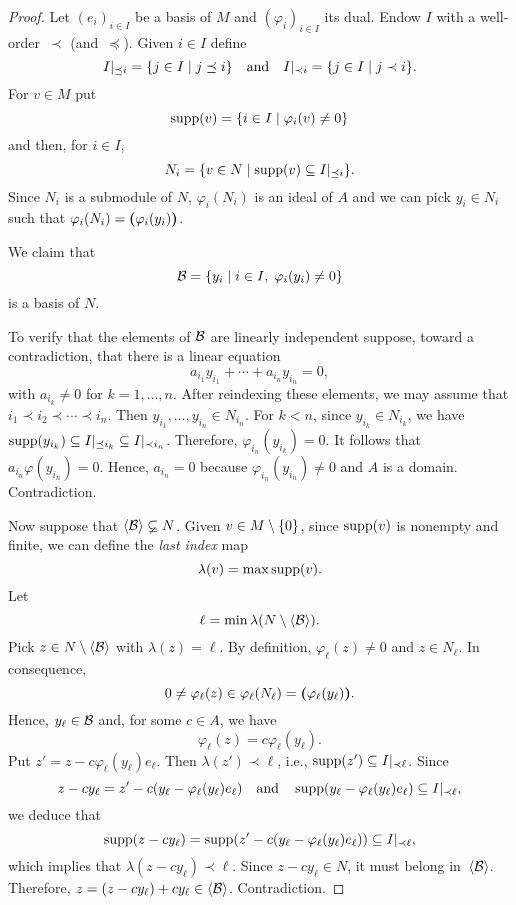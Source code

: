     \begin{proof}
        Let $(e_i)_{i\in I}$ be a basis of $M$ and $(\varphi_i)_{i\in I}$ its dual. Endow $I$ with a well-order~${\prec}$ (and~${\preceq}$). Given $i\in I$ define
        $$
            I|_{\preceq i}=\{j\in I\mid j\preceq i\}
            \quad\text{and}\quad
            I|_{\prec i}=\{j\in I\mid j\prec i\}.
        $$
        For $v\in M$ put
        $$
            \operatorname{supp}(v) = \{i\in I\mid \varphi_i(v)\ne0\}
        $$
        and then, for $i\in I$,
        $$
            N_i = \{v\in N\mid\operatorname{supp}(v)\subseteq I|_{\preceq i}\}.
        $$
        Since $N_i$ is a submodule of $N$, $\varphi_i(N_i)$ is an ideal of $A$ and we can pick $y_i\in N_i$ such that $\varphi_i(N_i)=\textrm{\boldmath$($}\varphi_i(y_i)\textrm{\boldmath$)$}$.
        
        We claim that
        $$
            \mathcal B = \{y_i\mid i\in I,\;\varphi_i(y_i)\ne0\}
        $$
        is a basis of $N$.

        To verify that the elements of $\mathcal B$ are linearly independent suppose, toward a contradiction, that there is a linear equation
        $$
            a_{i_1}y_{i_1}+\cdots+a_{i_n}y_{i_n}=0,
        $$
        with $a_{i_k}\ne0$ for $k=1,\dots,n$. After reindexing these elements, we may assume that $i_1\prec i_2\prec\cdots\prec i_n$. Then $y_{i_1},\dots,y_{i_n}\in N_{i_n}$. For $k<n$, since $y_{i_k}\in N_{i_k}$, we have $\operatorname{supp}(y_{i_k})\subseteq I|_{\preceq i_k}\subseteq I|_{\prec i_n}$. Therefore, $\varphi_{i_n}(y_{i_k})=0$. It follows that $a_{i_n}\varphi(y_{i_n})=0$. Hence, $a_{i_n}=0$ because $\varphi_{i_n}(y_{i_n})\ne0$ and $A$ is a domain. Contradiction.

        Now suppose that $\langle\mathcal B\rangle\varsubsetneq N$. Given $v\in M\setminus\{0\}$, since $\operatorname{supp}(v)$ is nonempty and finite, we can define the \textsl{last index} map
        $$
            \lambda(v)=\max\operatorname{supp}(v).
        $$
        Let
        $$
            \ell = \min\lambda(N\setminus\langle\mathcal B\rangle).
        $$
        Pick $z\in N\setminus\langle\mathcal B\rangle$ with $\lambda(z)=\ell$. By definition, $\varphi_\ell(z)\ne0$ and $z\in N_\ell$. In consequence,
        $$
            0\ne\varphi_\ell(z)\in\varphi_\ell(N_\ell)
                = \textrm{\boldmath$($}\varphi_\ell(y_\ell)\textrm{\boldmath$)$}.
        $$
        Hence, $y_\ell\in\mathcal B$ and, for some $c\in A$, we have
        $$
            \varphi_\ell(z) = c\varphi_\ell(y_\ell).
        $$
        Put $z'=z-c\varphi_\ell(y_\ell)e_\ell$. Then $\lambda(z')\prec\ell$, i.e., $\operatorname{supp}(z')\subseteq I|_{\prec\ell}$. Since
        $$
            z-cy_\ell =
                z'- c(y_\ell -\varphi_\ell(y_\ell)e_\ell)
        \quad\text{and}\quad
            \operatorname{supp}(y_\ell-\varphi_\ell(y_\ell)e_\ell)
                \subseteq I|_{\prec\ell},
        $$
        we deduce that
        $$
            \operatorname{supp}(z-cy_\ell)= \operatorname{supp}(z'-
            c(y_\ell -\varphi_\ell(y_\ell)e_\ell))
                \subseteq I|_{\prec\ell},
        $$
        which implies that $\lambda(z-cy_\ell)\prec\ell$. Since $z-cy_\ell\in N$, it must belong in~$\langle\mathcal B\rangle$. Therefore, $z=(z-cy_\ell)+cy_\ell\in\langle\mathcal B\rangle$. Contradiction.
        
    \end{proof}
\normalsize


